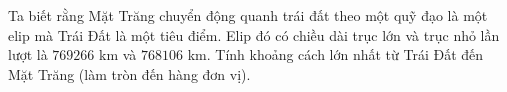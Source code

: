 \begin{bt}%
	Ta biết rằng Mặt Trăng chuyển động quanh trái đất theo một quỹ đạo là một elip mà Trái Đất là một tiêu điểm. Elip đó có chiều dài trục lớn và trục nhỏ lần lượt là $769 266$ km và $768 106$ km. Tính khoảng cách lớn nhất từ Trái Đất đến Mặt Trăng (làm tròn đến hàng đơn vị).
\end{bt}